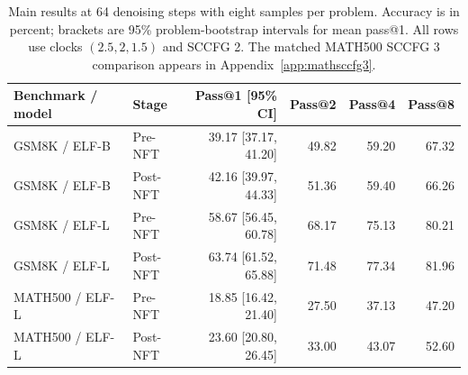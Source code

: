 \begin{table}[t]
\caption{Main results at 64 denoising steps with eight samples per problem. Accuracy is in percent; brackets are 95\% problem-bootstrap intervals for mean pass@1. All rows use clocks $(2.5,2,1.5)$ and SCCFG 2. The matched MATH500 SCCFG 3 comparison appears in Appendix~\ref{app:mathsccfg3}.}
\label{tab:main}
\centering\small
\begin{tabular}{llrrrr}
\toprule
Benchmark / model & Stage & Pass@1 [95\% CI] & Pass@2 & Pass@4 & Pass@8 \\
\midrule
GSM8K / ELF-B & Pre-NFT & 39.17 [37.17, 41.20] & 49.82 & 59.20 & 67.32 \\
GSM8K / ELF-B & Post-NFT & 42.16 [39.97, 44.33] & 51.36 & 59.40 & 66.26 \\
GSM8K / ELF-L & Pre-NFT & 58.67 [56.45, 60.78] & 68.17 & 75.13 & 80.21 \\
GSM8K / ELF-L & Post-NFT & 63.74 [61.52, 65.88] & 71.48 & 77.34 & 81.96 \\
MATH500 / ELF-L & Pre-NFT & 18.85 [16.42, 21.40] & 27.50 & 37.13 & 47.20 \\
MATH500 / ELF-L & Post-NFT & 23.60 [20.80, 26.45] & 33.00 & 43.07 & 52.60 \\
\bottomrule
\end{tabular}
\end{table}
